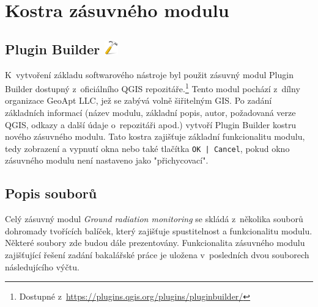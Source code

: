 \section{Kostra zásuvného modulu}
\subsection[Plugin Builder]{Plugin Builder \includegraphics[scale=0.1]{./pictures/plugin_builder.png}}
K~vytvoření základu softwarového nástroje byl použit zásuvný modul Plugin Builder dostupný z~oficiálního QGIS repozitáře.\footnote{Dostupné z~\url{https://plugins.qgis.org/plugins/pluginbuilder/}} Tento modul pochází z~dílny organizace GeoApt LLC, jež se zabývá volně šiřitelným GIS. Po zadání základních informací (název modulu, základní popis, autor, požadovaná verze QGIS, odkazy a další údaje o~repozitáři apod.) vytvoří Plugin Builder kostru nového zásuvného modulu. Tato kostra zajišťuje základní funkcionalitu modulu, tedy zobrazení a vypnutí okna nebo také tlačítka \texttt{OK | Cancel}, pokud okno zásuvného modulu není nastaveno jako "přichycovací". 

\subsection{Popis souborů}
Celý zásuvný modul \textit{Ground radiation monitoring} se skládá z~několika souborů dohromady tvořících balíček, který zajišťuje spustitelnost a funkcionalitu modulu. Některé soubory zde budou dále prezentovány. Funkcionalita zásuvného modulu zajišťující řešení zadání bakalářské práce je uložena v~posledních dvou souborech následujícího výčtu.

